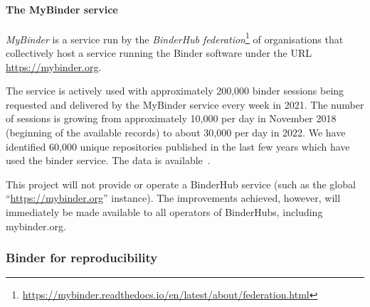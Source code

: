 \paragraph{The MyBinder service}\label{sec:mybinder}

\emph{MyBinder} is a service run by the \emph{BinderHub
  federation}\footnote{\url{https://mybinder.readthedocs.io/en/latest/about/federation.html}}
of organisations that collectively host a service running the Binder software
under the URL \url{https://mybinder.org}.

The service is actively used with approximately 200,000 binder sessions being
requested and delivered by the MyBinder service every week in 2021. The number
of sessions is growing from approximately 10,000 per day in November 2018
(beginning of the available records) to about 30,000 per day in 2022. We have
identified 60,000 unique repositories published in the last few years which have
used the binder service. The data is available~\cite{mybinder-archive}.

This project will not provide or operate a BinderHub service (such as the global
``\url{https://mybinder.org}'' instance). The improvements achieved, however, will immediately
be made available to all operators of BinderHubs, including mybinder.org.

\subsubsection{Binder for reproducibility}\label{sec:binder-for-reproducibility}




